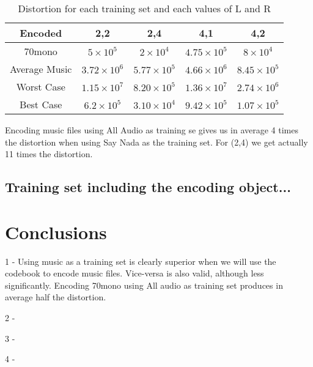 \documentclass[a4paper, 11pt]{article}
\begin{document}
			\begin{table}[H]
				\centering
				\begin{tabular}{c|c|c|c|c}
					\textbf{Encoded} & \textbf{2,2} 			& \textbf{2,4}			&  \textbf{4,1}				& \textbf{4,2} \\ \hline
					70mono			& $ 5 \times 10^{5} $ 		& $ 2 \times 10^{4} $	& $4.75 \times 10^{5} $ 	& $ 8 \times 10^{4} $ \\ \hline
					Average Music	& $ 3.72 \times 10^{6} $ 	& $ 5.77 \times 10^{5} $& $ 4.66 \times 10^{6} $  	& $ 8.45 \times 10^{5} $ \\ \hline	
					Worst Case 		& $ 1.15 \times 10^{7} $	& $	8.20 \times 10^{5} $& $ 1.36 \times 10^{7} $	& $ 2.74 \times 10^6 $ \\ \hline
					Best Case 		& $ 6.2 \times 10^{5} $		& $	3.10 \times 10^{4} $& $ 9.42 \times 10^{5} $ 	& $	1.07 \times 10^5 $ \\
				\end{tabular}
				\caption{Distortion for each training set and each values of L and R}
				\label{table:EncodeDist}
			\end{table}
		
			
			Encoding music files using All Audio as training se gives us in average 4 times the distortion when using Say Nada as the training set.
			For (2,4) we get actually 11 times the distortion.
			
		
		\subsection{Training set including the encoding object...}
			
	
	\section{Conclusions}
	
		1 - Using music as a training set is clearly superior when we will use the codebook to encode music files.
			Vice-versa is also valid, although less significantly. Encoding 70mono using All audio as training set produces in average half the distortion.
		
		2 - 
		
		3 - 
		
		4 - 
		
		
		
		
		
		
\end{document}
